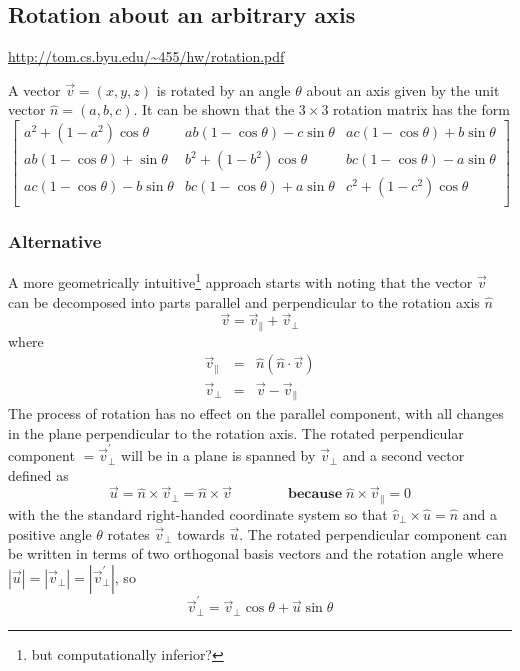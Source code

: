 \documentclass[12pt,twoside,openright]{report}
\begin{document}
\subsection{Rotation about an arbitrary axis}

\url{http://tom.cs.byu.edu/~455/hw/rotation.pdf}


A vector $\vec v = (x,y,z)$ is rotated by an angle $\theta$ about an axis given by the unit vector $\hat n = (a,b,c)$.  It can be shown that the $3\times3$ rotation matrix has the form
\begin{equation}\label{eqn:general_rotation_matrix}
\begin{bmatrix}
  a^2 + (1-a^2)\cos\theta & a b (1-\cos\theta) - c \sin\theta & a c (1-\cos\theta) + b \sin\theta \\
  a b (1-\cos\theta) +  \sin\theta & b^2 + (1-b^2)\cos\theta & b c (1-\cos\theta) - a \sin\theta \\
  a c (1-\cos\theta) - b \sin\theta & b c (1-\cos\theta) + a \sin\theta & c^2 + (1-c^2)\cos\theta \\
\end{bmatrix}
\end{equation}

\subsubsection{Alternative}
A more geometrically intuitive\footnote{but computationally inferior?} approach starts with noting that the vector $\vec v$ can be decomposed into parts parallel and perpendicular to the rotation axis $\hat n$
\begin{equation}\label{}
\vec v = {\vec v}_\parallel + {\vec v}_\perp
\end{equation}
where
\begin{subequations}\label{}
\begin{eqnarray}
{\vec v}_\parallel &=& \hat n (\hat n \cdot \vec v) \\
{\vec v}_\perp &=& \vec v - {\vec v}_\parallel
\end{eqnarray}
\end{subequations}
The process of rotation has no effect on the parallel component, with all changes in the plane perpendicular to the rotation axis.  The rotated perpendicular component $= {\vec v}_\perp^\prime$ will be in a plane is spanned by ${\vec v}_\perp$ and a second vector defined as
\begin{equation}\label{}
\vec u = \hat n \times {\vec v}_\perp = \hat n \times {\vec v}   \qquad\qquad \mathbf{because}\; \hat n \times {\vec v}_\parallel = 0
\end{equation}
with the the standard right-handed coordinate system so that ${\hat v}_\perp \times \hat u = \hat n$ and a positive angle $\theta$ rotates ${\vec v}_\perp$ towards $\vec u$.  The rotated perpendicular component  can be written in terms of two orthogonal basis vectors and the rotation angle where  $|{\vec u}| = |{\vec v}_\perp| = |{\vec v}_\perp^\prime|$, so
\begin{equation}\label{}
{\vec v}_\perp^\prime = {\vec v}_\perp \cos\theta + \vec u \sin\theta
\end{equation}
\end{document}
